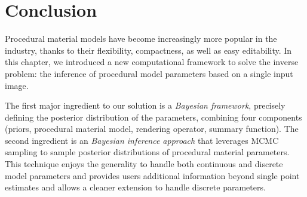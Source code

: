 \section{Conclusion}
\label{sec:bayesian:conclusion}

Procedural material models have become increasingly more popular in the industry, thanks to their flexibility, compactness, as well as easy editability.
In this chapter, we introduced a new computational framework to solve the inverse problem: the inference of procedural model parameters based on a single input image.

The first major ingredient to our solution is a \emph{Bayesian framework}, precisely defining the posterior distribution of the parameters, combining four components (priors, procedural material model, rendering operator, summary function). The second ingredient is an \emph{Bayesian inference approach} that leverages MCMC sampling to sample posterior distributions of procedural material parameters.  This technique enjoys the generality to handle both continuous and discrete model parameters and provides users additional information beyond single point estimates and allows a cleaner extension to handle discrete parameters.